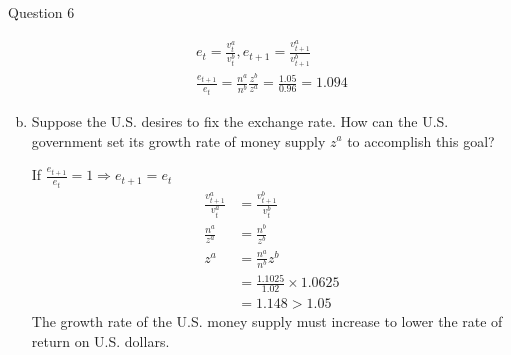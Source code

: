 \documentclass[a4paper]{article}
\newif\IfInSansMode
\numberwithin{equation}{section}
\numberwithin{figure}{section}
\begin{document}
\begin{questionbox}{Question 6}
\begin{enumerate}[(a)]
\begin{explanationbox}
\begin{gather*}
					e_t = \frac{v_t^a}{v_t^b}, e_{t+1} = \frac{v_{t+1}^a}{v_{t+1}^b}\\
					\frac{e_{t+1}}{e_t} = \frac{n^a}{n^b}\frac{z^b}{z^a} = \frac{1.05}{0.96} = 1.094
				\end{gather*}
			\end{explanationbox}
			\item Suppose the U.S. desires to fix the exchange rate. How can the U.S. government set its growth rate of money supply \( z^a \) to accomplish this goal?
			\begin{explanationbox}
				If \( \frac{e_{t+1}}{e_t} = 1 \Rightarrow e_{t+1} = e_t\)
				\begin{align*}
					\frac{v_{t+1}^a}{v_t^a} &= \frac{v_{t+1}^b}{v_t^b}\\
					\frac{n^a}{z^a} &= \frac{n^b}{z^b}\\
					z^a &= \frac{n^a}{n^b}z^b\\
					&=\frac{1.1025}{1.02}\times1.0625\\
					&= 1.148 > 1.05 
				\end{align*}
				The growth rate of the U.S. money supply must increase to lower the rate of return on U.S. dollars.
			\end{explanationbox}
		\end{enumerate}
	\end{questionbox}
\end{document}
